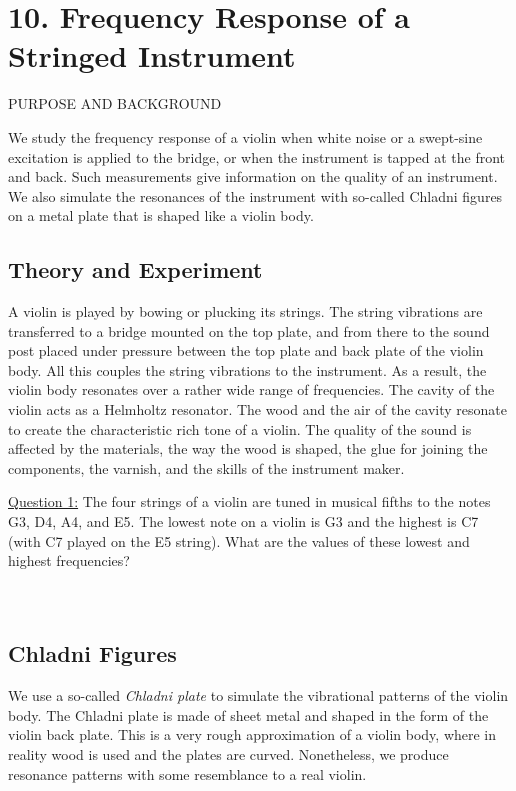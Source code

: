 \documentclass[11pt]{NSF}
\begin{document}
\section{10. Frequency Response of a Stringed Instrument}

PURPOSE AND BACKGROUND

We study the frequency response of a violin when white noise or a
swept-sine excitation is applied to the bridge, or when the 
instrument is tapped at the front and back. 
Such measurements give information on the quality of an
instrument. We also simulate the resonances of the instrument with
so-called Chladni figures on a metal plate that is shaped like a
violin body.


\subsection{Theory and Experiment}

A violin is played by bowing or plucking its strings. The string
vibrations are transferred to a bridge mounted on the top plate, and
from there to the sound post placed under pressure between the top
plate and back plate of the violin body. All this couples the string
vibrations to the instrument. As a result, the violin body resonates
over a rather wide range of frequencies. The cavity of the violin acts as a
Helmholtz resonator. The wood and the air of the cavity resonate to
create the characteristic rich tone of a violin. The quality of the
sound is affected by the materials, the way the wood is shaped, the
glue for joining the components, the varnish, and the skills of the
instrument maker.

\underline{Question 1:}
The four strings of a violin are tuned in musical fifths to the
notes G3, D4, A4, and E5. 
The lowest note on a violin is G3 and the highest is C7 
(with C7 played on the E5 string). 
What are the values of these lowest and highest frequencies? 
\\
\\
\\

\subsection{Chladni Figures}

We use a so-called {\em Chladni plate} to simulate the vibrational patterns
of the violin body. The Chladni plate is made of sheet metal and
shaped in the form of the violin back plate. This is a very rough
approximation of a violin body, where in reality wood is used and the
plates are curved. Nonetheless, we produce resonance patterns with
some resemblance to a real violin.
\end{document}
